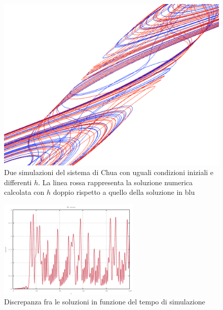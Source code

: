 \begin{figure}[H]
\centering
\includegraphics[width=\textwidth]{rk_error}
\caption{Due simulazioni del sistema di Chua con uguali condizioni iniziali e differenti $h$. La linea rossa rappresenta la soluzione numerica calcolata con $h$ doppio rispetto a quello della soluzione in blu}
\label{fig:rk_error}
\end{figure}

\begin{figure}[H]
\centering
\includegraphics[width=0.6\textwidth]{ode}
\caption{Discrepanza fra le soluzioni in funzione del tempo di simulazione}
\label{fig:ode}
\end{figure}

